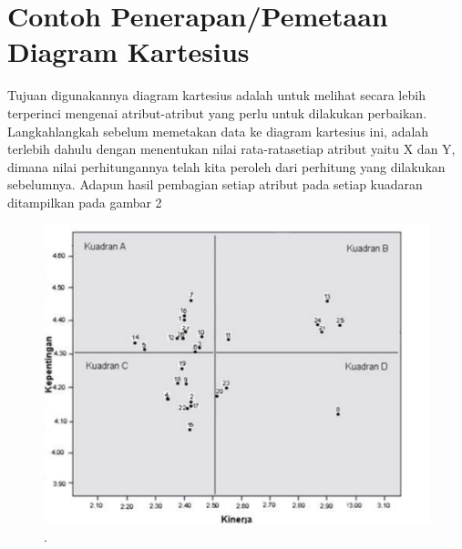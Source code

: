 \section{Contoh Penerapan/Pemetaan Diagram Kartesius}
Tujuan digunakannya diagram kartesius adalah untuk melihat secara lebih terperinci mengenai atribut-atribut yang perlu untuk dilakukan perbaikan. 
Langkahlangkah sebelum memetakan data ke diagram kartesius ini, adalah terlebih dahulu dengan menentukan nilai rata-ratasetiap atribut yaitu X dan Y, 
dimana nilai perhitungannya telah kita peroleh dari perhitung yang dilakukan sebelumnya.
Adapun hasil pembagian setiap atribut pada setiap kuadaran ditampilkan pada gambar 2
\begin{figure}[ht]
	\centerline{\includegraphics[width=1\textwidth]{figures/rahmi4.PNG}}
	\caption{.}
	\label{rahmi4}
	\end{figure}


